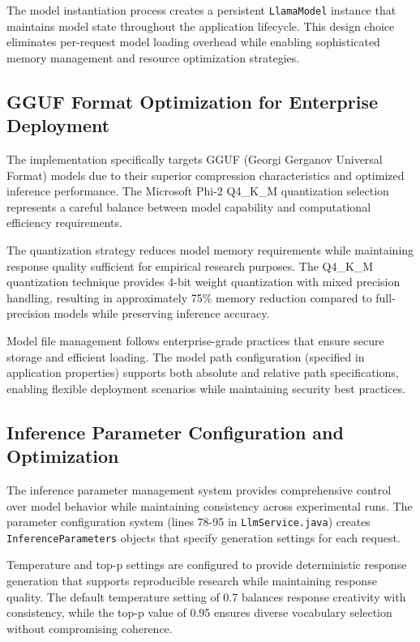 
The model instantiation process creates a persistent \texttt{LlamaModel} instance that maintains model state throughout the application lifecycle. This design choice eliminates per-request model loading overhead while enabling sophisticated memory management and resource optimization strategies.

\subsection{GGUF Format Optimization for Enterprise Deployment}

The implementation specifically targets GGUF (Georgi Gerganov Universal Format) models due to their superior compression characteristics and optimized inference performance. The Microsoft Phi-2 Q4\_K\_M quantization selection represents a careful balance between model capability and computational efficiency requirements.

The quantization strategy reduces model memory requirements while maintaining response quality sufficient for empirical research purposes. The Q4\_K\_M quantization technique provides 4-bit weight quantization with mixed precision handling, resulting in approximately 75\% memory reduction compared to full-precision models while preserving inference accuracy.

Model file management follows enterprise-grade practices that ensure secure storage and efficient loading. The model path configuration (specified in application properties) supports both absolute and relative path specifications, enabling flexible deployment scenarios while maintaining security best practices.

\subsection{Inference Parameter Configuration and Optimization}

The inference parameter management system provides comprehensive control over model behavior while maintaining consistency across experimental runs. The parameter configuration system (lines 78-95 in \texttt{LlmService.java}) creates \texttt{InferenceParameters} objects that specify generation settings for each request.


Temperature and top-p settings are configured to provide deterministic response generation that supports reproducible research while maintaining response quality. The default temperature setting of 0.7 balances response creativity with consistency, while the top-p value of 0.95 ensures diverse vocabulary selection without compromising coherence.

